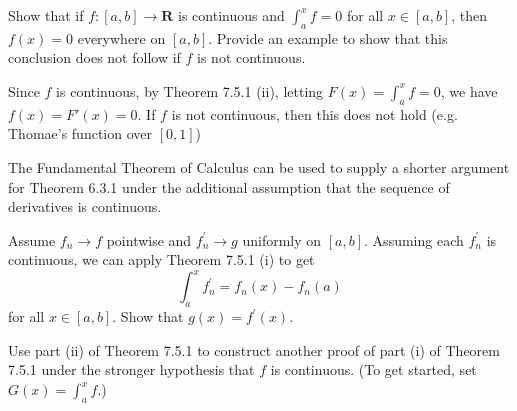 \begin{exercise} Show that if $f:[a, b] \rightarrow \mathbf{R}$ is continuous and $\int_{a}^{x} f=0$ for all $x \in[a, b]$, then $f(x)=0$ everywhere on $[a, b]$. Provide an example to show that this conclusion does not follow if $f$ is not continuous.
\end{exercise}
\begin{solution}
Since \(f\) is continuous, by Theorem 7.5.1 (ii), letting \(F(x) = \int^x_a f = 0\), we have \(f(x) = F'(x) = 0\). If \(f\) is not continuous, then this does not hold (e.g. Thomae's function over \([0,1]\))
\end{solution}

\begin{exercise}
The Fundamental Theorem of Calculus can be used to supply a shorter argument for Theorem 6.3.1 under the additional assumption that the sequence of derivatives is continuous.

Assume $f_{n} \rightarrow f$ pointwise and $f_{n}^{\prime} \rightarrow g$ uniformly on $[a, b]$. Assuming each $f_{n}^{\prime}$ is continuous, we can apply Theorem 7.5.1 (i) to get
$$
\int_{a}^{x} f_{n}^{\prime}=f_{n}(x)-f_{n}(a)
$$
for all $x \in[a, b]$. Show that $g(x)=f^{\prime}(x)$.
\end{exercise}
\begin{solution}
\TODO
\end{solution}

\begin{exercise}
\end{exercise}
\begin{solution}
    \TODO
\end{solution}

\begin{exercise} Use part (ii) of Theorem 7.5.1 to construct another proof of part (i) of Theorem 7.5.1 under the stronger hypothesis that $f$ is continuous. (To get started, set \(G(x)=\int_{a}^{x} f\).)
\end{exercise}
\begin{solution}
    \TODO
\end{solution}

